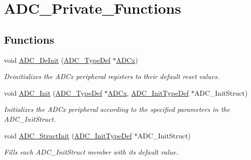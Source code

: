 \hypertarget{group___a_d_c___private___functions}{}\section{A\+D\+C\+\_\+\+Private\+\_\+\+Functions}
\label{group___a_d_c___private___functions}
\subsection*{Functions}
\begin{DoxyCompactItemize}
\item 
void \mbox{\hyperlink{group___a_d_c___private___functions_ga31fa6bc09de17125e9db2830ce77c09b}{A\+D\+C\+\_\+\+De\+Init}} (\mbox{\hyperlink{struct_a_d_c___type_def}{A\+D\+C\+\_\+\+Type\+Def}} $\ast$\mbox{\hyperlink{group___s_t_m32_f1_x_x___n_u_c_l_e_o___l_o_w___l_e_v_e_l___exported___constants_gab44c1065d38c298955fc028346984340}{A\+D\+Cx}})
\begin{DoxyCompactList}\small\item\em Deinitializes the A\+D\+Cx peripheral registers to their default reset values. \end{DoxyCompactList}\item 
void \mbox{\hyperlink{group___a_d_c___private___functions_gabbab6038cf8691404350625e477254f9}{A\+D\+C\+\_\+\+Init}} (\mbox{\hyperlink{struct_a_d_c___type_def}{A\+D\+C\+\_\+\+Type\+Def}} $\ast$\mbox{\hyperlink{group___s_t_m32_f1_x_x___n_u_c_l_e_o___l_o_w___l_e_v_e_l___exported___constants_gab44c1065d38c298955fc028346984340}{A\+D\+Cx}}, \mbox{\hyperlink{struct_a_d_c___init_type_def}{A\+D\+C\+\_\+\+Init\+Type\+Def}} $\ast$A\+D\+C\+\_\+\+Init\+Struct)
\begin{DoxyCompactList}\small\item\em Initializes the A\+D\+Cx peripheral according to the specified parameters in the A\+D\+C\+\_\+\+Init\+Struct. \end{DoxyCompactList}\item 
void \mbox{\hyperlink{group___a_d_c___private___functions_ga6c6e754d1d0a98d56e465efaf73272ec}{A\+D\+C\+\_\+\+Struct\+Init}} (\mbox{\hyperlink{struct_a_d_c___init_type_def}{A\+D\+C\+\_\+\+Init\+Type\+Def}} $\ast$A\+D\+C\+\_\+\+Init\+Struct)
\begin{DoxyCompactList}\small\item\em Fills each A\+D\+C\+\_\+\+Init\+Struct member with its default value. \end{DoxyCompactList}\item 

\end{DoxyCompactItemize}
